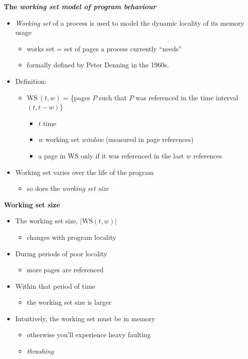 \documentclass[11pt,a4paper]{article}
\begin{document}
\textbf{The \emph{working set model of program behaviour}}
\begin{itemize}
    \item \emph{Working set} of a process is used to model the dynamic locality of its memory
        usage
        \begin{itemize}
            \item works set = set of pages a process currently ``needs''
            \item formally defined by Peter Denning in the 1960s.
        \end{itemize}
    \item Definition:
        \begin{itemize}
            \item WS\,$(t, w)$ = \{pages $P$ such that $P$ was referenced in the time interval
                $(t, t-w)$\}
                \begin{itemize}
                    \item $t$ time
                    \item $w$ working set \emph{window} (measured in page references)
                    \item a page in WS only if it was referenced in the last $w$ references
                \end{itemize}
        \end{itemize}
    \item Working set varies over the life of the program
        \begin{itemize}
            \item so does the \emph{working set size}
        \end{itemize}
\end{itemize}

\textbf{Working set size}
\begin{itemize}
    \item The working set size, $|\mathrm{WS}(t, w)|$
        \begin{itemize}
            \item changes with program locality
        \end{itemize}
    \item During periods of poor locality
        \begin{itemize}
            \item more pages are referenced
        \end{itemize}
    \item Within that period of time
        \begin{itemize}
            \item the working set size is larger
        \end{itemize}
    \item Intuitively, the working set must be in memory
        \begin{itemize}
            \item otherwise you'll experience heavy faulting
            \item \emph{thrashing}
        \end{itemize}
\end{itemize}
\end{document}
